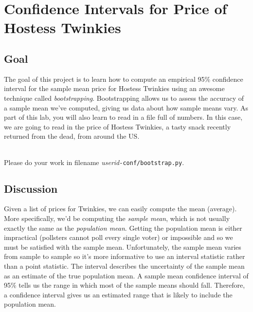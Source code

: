 \documentclass[titlepage]{tufte-book}
\newcounter{problem}
\begin{document}
\chapter{Confidence Intervals for Price of Hostess Twinkies}

\setcounter{problem}{1}
\section{Goal}

\begin{fullwidth}

The goal of this project is to learn how to compute an empirical 95\% confidence interval for the sample mean price for Hostess Twinkies using an awesome technique called {\em bootstrapping}. Bootstrapping allows us to assess the accuracy of a sample mean we've computed, giving us data about how sample means vary. As part of this lab, you will also learn to read in a file full of numbers. In this case, we are going to read in the price of Hostess Twinkies, a tasty snack recently returned from the dead, from around the US.

~\\
\noindent Please do your work in filename {\em userid}{\tt -conf/bootstrap.py}.

\section{Discussion}

Given a list of prices for Twinkies, we can easily compute the mean (average). More specifically, we'd be computing the {\em sample mean}, which is not usually exactly the same as the {\em population mean}. Getting the population mean is either impractical (pollsters cannot poll every single voter) or impossible and so we must be satisfied with the sample mean.  Unfortunately, the sample mean varies from sample to sample so it's more informative to use an interval statistic rather than a point statistic. The interval describes the uncertainty of the sample mean as an estimate of the true population mean.  A sample mean confidence interval of 95\% tells us the range in which most of the sample means should fall. Therefore, a confidence interval gives us an estimated range that is likely to include the population mean.


\end{fullwidth}
\end{document}
